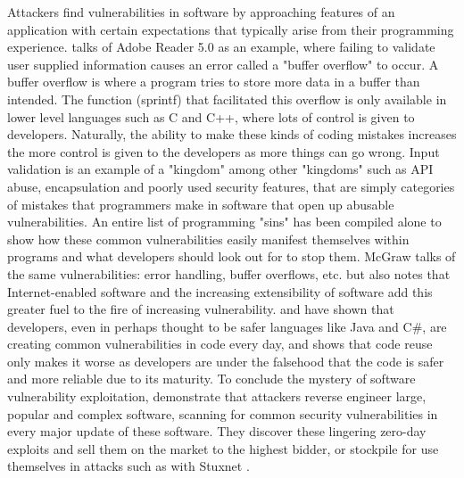 \documentclass[a4paper, 11pt]{article}
\begin{document}
Attackers find vulnerabilities in software by approaching features of an application with certain expectations that typically arise from their programming experience. \cite{ref:sinstsipenyuk2005seven} talks of Adobe Reader 5.0 as an example, where failing to validate user supplied information causes an error called a "buffer overflow" to occur. A buffer overflow is where a program tries to store more data in a buffer than intended. \cite{ref:jang2014survey} The function (sprintf) that facilitated this overflow is only available in lower level languages such as C and C++, where lots of control is given to developers. Naturally, the ability to make these kinds of coding mistakes increases the more control is given to the developers as more things can go wrong. Input validation is an example of a "kingdom" among other "kingdoms" such as API abuse, encapsulation and poorly used security features, that are simply categories of mistakes that programmers make in software that open up abusable vulnerabilities. \cite{ref:sinstsipenyuk2005seven} An entire list of programming "sins" has been compiled alone to show how these common vulnerabilities easily manifest themselves within programs and what developers should look out for to stop them. \cite{ref:howardprogrammingsins200519} McGraw \cite{ref:mcgraw2004software} talks of the same vulnerabilities: error handling, buffer overflows, etc. but also notes that Internet-enabled software and the increasing extensibility of software add this greater fuel to the fire of increasing vulnerability. \cite{ref:sinstsipenyuk2005seven, ref:howardprogrammingsins200519} and \cite{ref:mcgraw2004software} have shown that developers, even in perhaps thought to be safer languages like Java and C\#, are creating common vulnerabilities in code every day, and \cite{ref:honeymoonsoftware} shows that code reuse only makes it worse as developers are under the falsehood that the code is safer and more reliable due to its maturity. To conclude the mystery of software vulnerability exploitation, \cite{ref:sinstsipenyuk2005seven,ref:honeymoonsoftware,ref:howardprogrammingsins200519,ref:mcgraw2004software,ref:biometricattackvectors,ref:stuxnet2011report} demonstrate that attackers reverse engineer large, popular and complex software, scanning for common security vulnerabilities in every major update of these software. They discover these lingering zero-day exploits and sell them on the market \cite{ref:jang2014survey} to the highest bidder, or stockpile for use themselves in attacks such as with Stuxnet \cite{ref:stuxnet2011report}.
\end{document}
